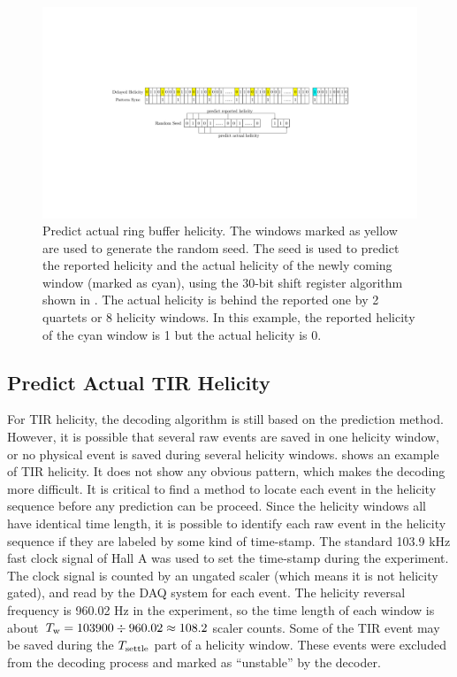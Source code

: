\begin{figure}[tb!]
  \centering
  \includegraphics[width=\textwidth]{figs/ring-buffer-helicity.pdf}
  \caption[Predict actual ring buffer helicity.]{Predict actual ring buffer helicity. The windows marked as yellow are used to generate the random seed. The seed is used to predict the reported helicity and the actual helicity of the newly coming window (marked as cyan), using the 30-bit shift register algorithm shown in . The actual helicity is behind the reported one by 2 quartets or 8 helicity windows. In this example, the reported helicity of the cyan window is 1 but the actual helicity is 0. \label{A1S2SS1F1}}
\end{figure}

\subsection{Predict Actual TIR Helicity}
\label{A1S2SS2}

For TIR helicity, the decoding algorithm is still based on the prediction method. However, it is possible that several raw events are saved in one helicity window, or no physical event is saved during several helicity windows.  shows an example of TIR helicity. It does not show any obvious pattern, which makes the decoding more difficult. It is critical to find a method to locate each event in the helicity sequence before any prediction can be proceed. Since the helicity windows all have identical time length, it is possible to identify each raw event in the helicity sequence if they are labeled by some kind of time-stamp. The standard 103.9 kHz fast clock signal of Hall A was used to set the time-stamp during the experiment. The clock signal is counted by an ungated scaler (which means it is not helicity gated), and read by the DAQ system for each event. The helicity reversal frequency is 960.02 Hz in the experiment, so the time length of each window is about $\tw=103900\divisionsymbol960.02\approx108.2$ scaler counts. Some of the TIR event may be saved during the $T_{\mathrm{settle}}$ part of a helicity window. These events were excluded from the decoding process and marked as ``unstable'' by the decoder.

